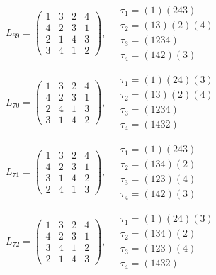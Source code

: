 $L_{69} = \begin{pmatrix} 1 & 3 & 2 & 4 \\ 4 & 2 & 3 & 1 \\ 2 & 1 & 4 & 3 \\ 3 & 4 & 1 & 2 \end{pmatrix}, \quad \begin{matrix} \tau_{1} = (1)(2 4 3) \\ \tau_{2} = (1 3)(2)(4) \\ \tau_{3} = (1 2 3 4) \\ \tau_{4} = (1 4 2)(3) \end{matrix}$

$L_{70} = \begin{pmatrix} 1 & 3 & 2 & 4 \\ 4 & 2 & 3 & 1 \\ 2 & 4 & 1 & 3 \\ 3 & 1 & 4 & 2 \end{pmatrix}, \quad \begin{matrix} \tau_{1} = (1)(2 4)(3) \\ \tau_{2} = (1 3)(2)(4) \\ \tau_{3} = (1 2 3 4) \\ \tau_{4} = (1 4 3 2) \end{matrix}$

$L_{71} = \begin{pmatrix} 1 & 3 & 2 & 4 \\ 4 & 2 & 3 & 1 \\ 3 & 1 & 4 & 2 \\ 2 & 4 & 1 & 3 \end{pmatrix}, \quad \begin{matrix} \tau_{1} = (1)(2 4 3) \\ \tau_{2} = (1 3 4)(2) \\ \tau_{3} = (1 2 3)(4) \\ \tau_{4} = (1 4 2)(3) \end{matrix}$

$L_{72} = \begin{pmatrix} 1 & 3 & 2 & 4 \\ 4 & 2 & 3 & 1 \\ 3 & 4 & 1 & 2 \\ 2 & 1 & 4 & 3 \end{pmatrix}, \quad \begin{matrix} \tau_{1} = (1)(2 4)(3) \\ \tau_{2} = (1 3 4)(2) \\ \tau_{3} = (1 2 3)(4) \\ \tau_{4} = (1 4 3 2) \end{matrix}$

